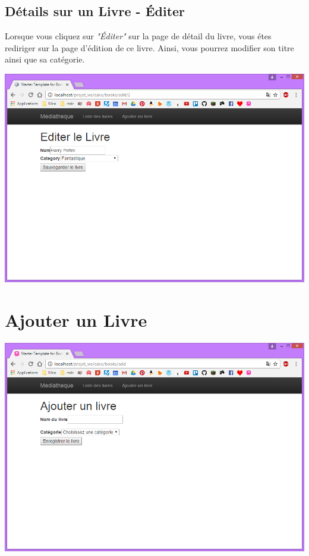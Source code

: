 \documentclass{report}
\begin{document}
			\subsection{D\'{e}tails sur un Livre - \'{E}diter}
			Lorsque vous cliquez sur \textit{"\'{E}diter"} sur la page de d\'{e}tail du livre, vous \'{e}tes rediriger sur la page d'\'{e}dition de ce livre. Ainsi, vous pourrez modifier son titre ainsi que sa cat\'{e}gorie.
			\begin{center}
				\includegraphics[scale=0.4]{img/manuel/DetailLivre_Editer.png}  
			\end{center}
			
		\section{Ajouter un Livre}
		\begin{center}
			\includegraphics[scale=0.4]{img/manuel/DetailAjouterLivre.png}  
		\end{center}
		
\end{document}
